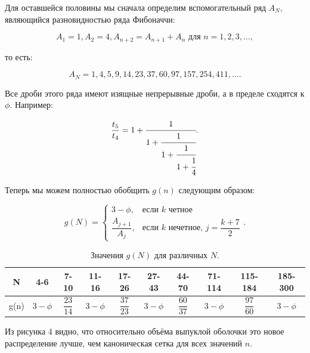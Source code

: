 \documentclass[12pt, a4paper]{article}
\begin{document}
Для оставшейся половины мы сначала определим вспомогательный ряд $A_N$, являющийся разновидностью ряда Фибоначчи:

\begin{displaymath}
    A_1 =1, A_2 = 4, A_{n+2}= A_{n+1}+A_n \textrm{ для } n = 1,2,3, \ldots,
\end{displaymath}

\noindent то есть:

\begin{displaymath}
    A_N = 1,4,5,9,14,23,37,60,97,157,254,411, \ldots.
\end{displaymath}

\newpage

Все дроби этого ряда имеют изящные непрерывные дроби, а в пределе сходятся к $\phi$. Например:

\begin{displaymath}
    \frac{t_5}{t_4} = 1 + \cfrac{1}{1 + \cfrac{1}{1 + \cfrac{1}{ 1 + \cfrac{1}{4}}}}.
\end{displaymath}

Теперь мы можем полностью обобщить $g(n)$ следующим образом:

\begin{displaymath}
    g(N) =
        \begin{cases}
            3-\phi, & \text{если $k$ четное} \\
            \dfrac{A_{j+1}}{A_j} , & \text{если $k$ нечетное, $j=\dfrac{k+7}{2}$}
         \end{cases}.
    \tag{6}
\end{displaymath}

\begin{table}[H]
\caption{Значения $g(N)$ для различных $N$.}
\begin{center}
\begin{tabular}{ |c|c|c|c|c|c|c|c|c|c| } 
\hline
\rule[-1.5ex]{0pt}{4.5ex} N & 4-6 & 7-10 & 11-16 & 17-26 & 27-43 & 44-70 & 71-114 & 115-184 & 185-300 \\
\hline
\rule[-3ex]{0pt}{7.5ex} g(n) & $3-\phi$ & $\dfrac{23}{14}$ & $3-\phi$ & $\dfrac{37}{23}$ & $3-\phi$ & $\dfrac{60}{37}$ & $3-\phi$ & $\dfrac{97}{60}$ & $3-\phi$ \\
\hline
\end{tabular}
\end{center}
\end{table}

Из рисунка 4 видно, что относительно объёма выпуклой оболочки это новое распределение лучше, чем каноническая сетка для всех значений $n$.
\end{document}
